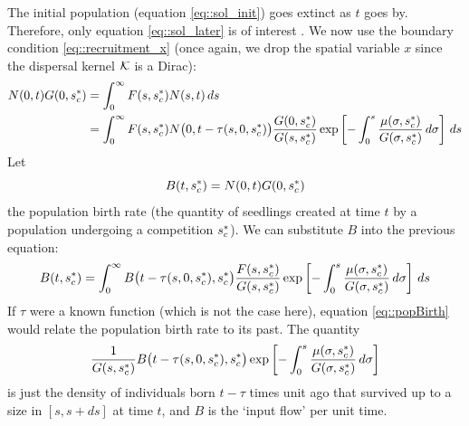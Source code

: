 \begin{refsection}
The initial population (equation \eqref{eq::sol_init}) goes extinct as $ t $ goes by. Therefore, only equation \eqref{eq::sol_later} is of interest \citep{DeRoos1997}. We now use the boundary condition \eqref{eq::recruitment_x} (once again, we drop the spatial variable $ x $ since the dispersal kernel $ \mathcal{K} $ is a Dirac):
\begin{align*}
	N(0, t) G(0, {s}^{*}_c) &= \int_{0}^{\infty} F(s, {s}^{*}_c) N(s, t) \, ds \\
		&= \int_{0}^{\infty} F(s, {s}^{*}_c) N \big( 0, t - \tau(s, 0, {s}^{*}_c) \big) \frac{G(0, {s}^{*}_c)}{G(s, {s}^{*}_c)} \exp \left[ -\int_{0}^{s} \frac{\mu(\sigma, {s}^{*}_c)}{G(\sigma, {s}^{*}_c)} \, d\sigma \right] \, ds
\end{align*}
Let
\[
	B(t, {s}^{*}_c) = N(0, t) G(0, {s}^{*}_c)
\]
the population birth rate (\ie the quantity of seedlings created at time $ t $ by a population undergoing a competition $ {s}^{*}_c $). We can substitute $ B $ into the previous equation:
\begin{equation} \label{eq::popBirth}
	B(t, {s}^{*}_c) = \int_{0}^{\infty} B \big(t - \tau(s, 0, {s}^{*}_c), {s}^{*}_c \big) \frac{F(s, {s}^{*}_c)}{G(s, {s}^{*}_c)} \exp \left[ -\int_{0}^{s} \frac{\mu(\sigma, {s}^{*}_c)}{G(\sigma, {s}^{*}_c)} \, d\sigma \right] \, ds
\end{equation}
If $ \tau $ were a known function (which is not the case here), equation \eqref{eq::popBirth} would relate the population birth rate to its past. The quantity
\[
	\frac{1}{G(s, {s}^{*}_c)} B \big(t - \tau(s, 0, {s}^{*}_c), {s}^{*}_c \big) \exp \left[ -\int_{0}^{s} \frac{\mu(\sigma, {s}^{*}_c)}{G(\sigma, {s}^{*}_c)} \, d\sigma \right]
\]
is just the density of individuals born $ t - \tau $ times unit ago that survived up to a size in $ [s, s + ds] $ at time $ t $, and $ B $ is the `input flow' per unit time.


\end{refsection}

